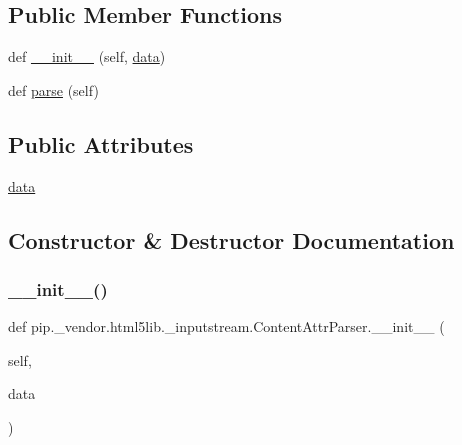 \subsection*{Public Member Functions}
\begin{DoxyCompactItemize}
\item 
def \hyperlink{classpip_1_1__vendor_1_1html5lib_1_1__inputstream_1_1ContentAttrParser_af5c33580111f462065a43336ef887fb0}{\+\_\+\+\_\+init\+\_\+\+\_\+} (self, \hyperlink{classpip_1_1__vendor_1_1html5lib_1_1__inputstream_1_1ContentAttrParser_a263f8d28a3e2cc6a8f21c8dd6f5c3de5}{data})
\item 
def \hyperlink{classpip_1_1__vendor_1_1html5lib_1_1__inputstream_1_1ContentAttrParser_ab15ee7a7a410c0c39c5bba41fea5671c}{parse} (self)
\end{DoxyCompactItemize}
\subsection*{Public Attributes}
\begin{DoxyCompactItemize}
\item 
\hyperlink{classpip_1_1__vendor_1_1html5lib_1_1__inputstream_1_1ContentAttrParser_a263f8d28a3e2cc6a8f21c8dd6f5c3de5}{data}
\end{DoxyCompactItemize}


\subsection{Constructor \& Destructor Documentation}
\mbox{\label{classpip_1_1__vendor_1_1html5lib_1_1__inputstream_1_1ContentAttrParser_af5c33580111f462065a43336ef887fb0}} 
\subsubsection{\texorpdfstring{\+\_\+\+\_\+init\+\_\+\+\_\+()}{\_\_init\_\_()}}
{\footnotesize\ttfamily def pip.\+\_\+vendor.\+html5lib.\+\_\+inputstream.\+Content\+Attr\+Parser.\+\_\+\+\_\+init\+\_\+\+\_\+ (\begin{DoxyParamCaption}\item[{}]{self,  }\item[{}]{data }\end{DoxyParamCaption})}



